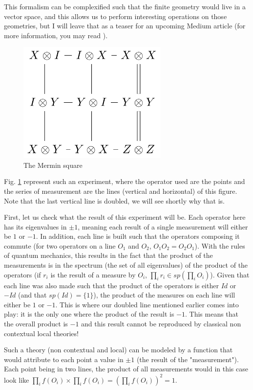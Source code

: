 \documentclass{article}
\begin{document}
This formalism can be complexified such that the finite geometry would live in a
vector space, and this allows us to perform interesting operations on those
geometries, but I will leave that as a teaser for an upcoming Medium article
(for more information, you may read \cite{dHG+22}).

\begin{figure}[!ht]
\centerline{\includegraphics[height=6cm]{resources/mermin-square.png}}
\caption{The Mermin square}
\label{fig:mermin-square}
\end{figure}

Fig. \ref{fig:mermin-square} represent such an experiment, where the operator
used are the points and the series of measurement are the lines (vertical and
horizontal) of this figure. Note that the last vertical line is doubled, we will
see shortly why that is.

First, let us check what the result of this experiment will be. Each operator
here has its eigenvalues in $\pm1$, meaning each result of a single measurement
will either be $1$ or $-1$. In addition, each line is built such that the
operators composing it commute (for two operators on a line $O_1$ and $O_2$,
$O_1O_2=O_2O_1$). With the rules of quantum mechanics, this results in the
fact that the product of the measurements is in the spectrum (the set of all
eigenvalues) of the product of the operators (if $r_i$ is the result of a
measure by $O_i$, $\prod_i r_i \in sp(\prod_i O_i)$). Given that each line was
also made such that the product of the operators is either $Id$ or $-Id$ (and
that $sp(Id)=\{1\}$), the product of the measures on each line will either be $1$
or $-1$. This is where our doubled line mentioned earlier comes into play: it is
the only one where the product of the result is $-1$. This means that the overall
product is $-1$ and this result cannot be reproduced by classical non contextual
local theories!

Such a theory (non contextual and local) can be modeled by a function that would
attribute to each point a value in $\pm1$ (the result of the "measurement"). Each
point being in two lines, the product of all measurements would in this case look
like $\prod_i f(O_i) \times \prod_i f(O_i) = (\prod_i f(O_i))^2 = 1$.
\end{document}
